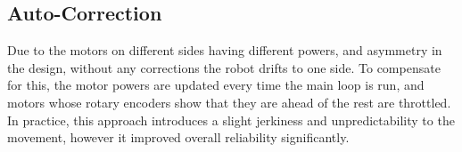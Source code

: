 \subsection{Auto-Correction}

Due to the motors on different sides having different powers, and asymmetry in
the design, without any corrections the robot drifts to one side. To compensate
for this, the motor powers are updated every time the main loop is run, and
motors whose rotary encoders show that they are ahead of the rest are
throttled. In practice, this approach introduces a slight jerkiness and
unpredictability to the movement, however it improved overall reliability
significantly.
